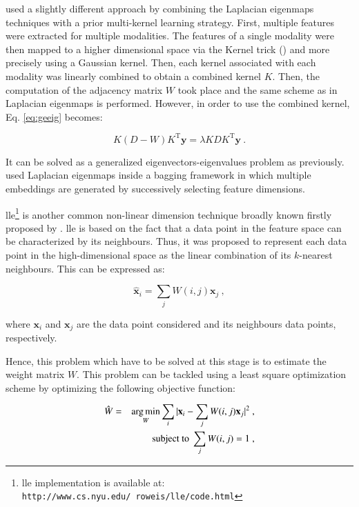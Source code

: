 \cite{Tiwari2009,Tiwari2013} used a slightly different approach by combining the Laplacian eigenmaps techniques with a prior multi-kernel learning strategy. First, multiple features were extracted for multiple modalities. The features of a single modality were then mapped to a higher dimensional space via the Kernel trick (\cite{Aizerman1964}) and more precisely using a Gaussian kernel. Then, each kernel associated with each modality was linearly combined to obtain a combined kernel $K$. Then, the computation of the adjacency matrix $W$ took place and the same scheme as in Laplacian eigenmaps is performed. However, in order to use the combined kernel, Eq. \eqref{eq:geeig} becomes:

\begin{equation}
	K (D-W) K^{\text{T}} \mathbf{y} = \lambda K D K^{\text{T}} \mathbf{y} \ .
	\label{eq:sesmik}
\end{equation}

It can be solved as a generalized eigenvectors-eigenvalues problem as previously. \cite{Viswanath2011} used Laplacian eigenmaps inside a bagging framework in which multiple embeddings are generated by successively selecting feature dimensions.


\ac{lle}\footnote{\ac{lle} implementation is available at: \texttt{http://www.cs.nyu.edu/\allowbreak ~roweis/lle/code.html}} is another common non-linear dimension technique broadly known firstly proposed by \cite{Roweis2000}. \ac{lle} is based on the fact that a data point in the feature space can be characterized by its neighbours. Thus, it was proposed to represent each data point in the high-dimensional space as the linear combination of its $k$-nearest neighbours. This can be expressed as:

\begin{equation}
	\hat{\mathbf{x}}_i = \sum_j W(i,j) \mathbf{x}_j \ ,
	\label{eq:lincomlle}
\end{equation}

\noindent where $\mathbf{x}_i$ and $\mathbf{x}_j$ are the data point considered and its neighbours data points, respectively.

Hence, this problem which have to be solved at this stage is to estimate the weight matrix $W$. This problem can be tackled using a least square optimization scheme by optimizing the following objective function:

\begin{eqnarray}
	\hat{W} & = & \operatorname*{arg\,min}_{W} \sum_i | \mathbf{x}_i - \sum_j W(i,j)\mathbf{x}_j |^{2} \ , \label{eq:lslle} \\
	&& \text{subject to } \sum_j W(i,j) = 1 \ , \nonumber
\end{eqnarray}

